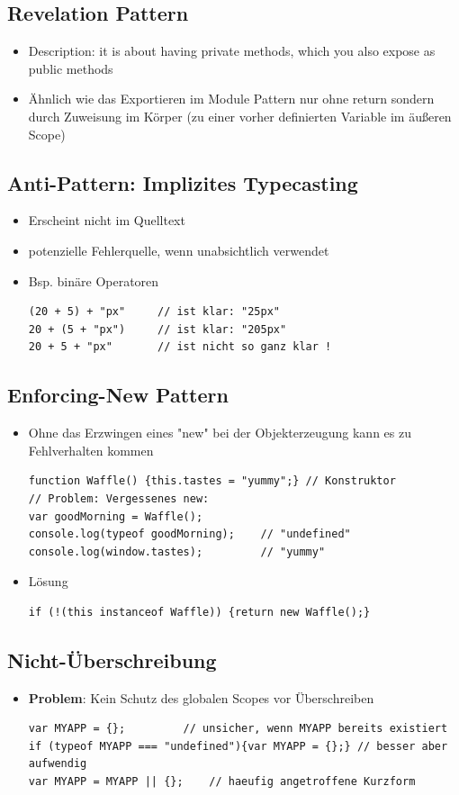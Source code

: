 \documentclass{article} %
\begin{document}
		\subsection{Revelation Pattern}
		\begin{itemize}
			\item Description: it is about having private methods, which you also expose as public methods
			\item Ähnlich wie das Exportieren im Module Pattern nur ohne return sondern durch Zuweisung im Körper (zu einer vorher definierten Variable im äußeren Scope)
		\end{itemize}
		\subsection{Anti-Pattern: Implizites Typecasting}
		\begin{itemize}
			\item Erscheint nicht im Quelltext
			\item potenzielle Fehlerquelle, wenn unabsichtlich verwendet 
			\item Bsp. binäre Operatoren
			 \begin{lstlisting}
(20 + 5) + "px"		// ist klar: "25px"
20 + (5 + "px") 	// ist klar: "205px"
20 + 5 + "px" 		// ist nicht so ganz klar !
			\end{lstlisting}
		\end{itemize}
		\subsection{Enforcing-New Pattern}
		\begin{itemize}
			\item Ohne das Erzwingen eines "new" bei der Objekterzeugung kann es zu Fehlverhalten kommen
			 \begin{lstlisting}
function Waffle() {this.tastes = "yummy";} // Konstruktor
// Problem: Vergessenes new:
var goodMorning = Waffle();
console.log(typeof goodMorning); 	// "undefined"
console.log(window.tastes); 		// "yummy"
			\end{lstlisting}
			\item Lösung
			\begin{lstlisting}
if (!(this instanceof Waffle)) {return new Waffle();}
			\end{lstlisting}	
		\end{itemize}
		\subsection{Nicht-Überschreibung}
		\begin{itemize}
			\item \textbf{Problem}: Kein Schutz des globalen Scopes vor Überschreiben
			\begin{lstlisting}
var MYAPP = {}; 		// unsicher, wenn MYAPP bereits existiert
if (typeof MYAPP === "undefined"){var MYAPP = {};} // besser aber aufwendig
var MYAPP = MYAPP || {}; 	// haeufig angetroffene Kurzform
			\end{lstlisting}	
		\end{itemize}
\end{document}
